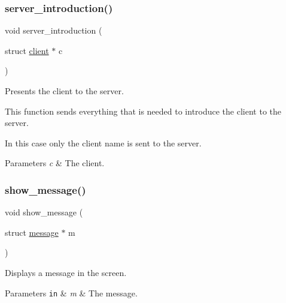 \subsubsection{\texorpdfstring{server\+\_\+introduction()}{server\_introduction()}}
{\footnotesize\ttfamily void server\+\_\+introduction (\begin{DoxyParamCaption}\item[{struct \hyperlink{structclient}{client} $\ast$}]{c }\end{DoxyParamCaption})}



Presents the client to the server. 

This function sends everything that is needed to introduce the client to the server.

In this case only the client name is sent to the server.


\begin{DoxyParams}{Parameters}
{\em c} & The client. \\
\hline
\end{DoxyParams}
\mbox{\label{zip-zop-client_8c_aec5550cf115ba01d0da023ba9d1876bb}} 
\subsubsection{\texorpdfstring{show\+\_\+message()}{show\_message()}}
{\footnotesize\ttfamily void show\+\_\+message (\begin{DoxyParamCaption}\item[{struct \hyperlink{structmessage}{message} $\ast$}]{m }\end{DoxyParamCaption})}



Displays a message in the screen. 


\begin{DoxyParams}[1]{Parameters}
\mbox{\tt in}  & {\em m} & The message. \\
\hline
\end{DoxyParams}
\mbox{\label{zip-zop-client_8c_a7ca038c133aa6aca1c539e69d4ee675f}} 
